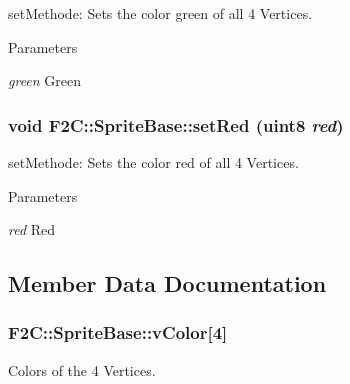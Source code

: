 setMethode: Sets the color green of all 4 Vertices. 
\begin{DoxyParams}{Parameters}
\item[{\em green}]Green \end{DoxyParams}
\hypertarget{class_f2_c_1_1_sprite_base_a4a931a54423a0aae08eacc30e96d485f}{
\subsubsection[{setRed}]{\setlength{\rightskip}{0pt plus 5cm}void F2C::SpriteBase::setRed ({\bf uint8} {\em red})}}
\label{class_f2_c_1_1_sprite_base_a4a931a54423a0aae08eacc30e96d485f}


setMethode: Sets the color red of all 4 Vertices. 
\begin{DoxyParams}{Parameters}
\item[{\em red}]Red \end{DoxyParams}


\subsection{Member Data Documentation}
\hypertarget{class_f2_c_1_1_sprite_base_ae05d180666e3750a5d5f909f04e686c4}{
\subsubsection[{vColor}]{ {\bf F2C::SpriteBase::vColor}\mbox{[}4\mbox{]}}}
\label{class_f2_c_1_1_sprite_base_ae05d180666e3750a5d5f909f04e686c4}


Colors of the 4 Vertices.  